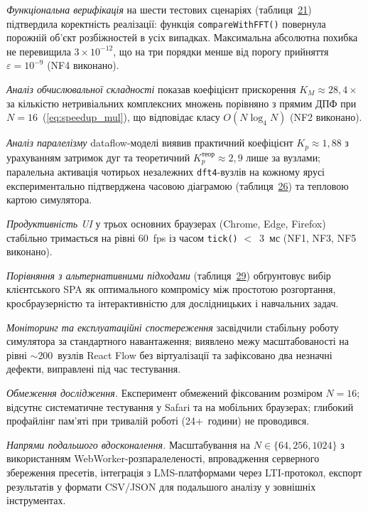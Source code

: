 \emph{Функціональна верифікація} на шести тестових сценаріях
(таблиця~\hyperref[tab:scenarios]{21}) підтвердила коректність
реалізації: функція \texttt{compareWithFFT()} повернула порожній об'єкт
розбіжностей в усіх випадках. Максимальна абсолютна похибка не
перевищила \(3 \times 10^{- 12}\), що на три порядки менше від порогу
прийняття \(\varepsilon = 10^{- 9}\) (NF4 виконано).

\emph{Аналіз обчислювальної складності} показав коефіцієнт прискорення
\(K_{M} \approx 28,4 \times\) за кількістю нетривіальних комплексних
множень порівняно з прямим ДПФ при
\(N = 16\)~(\hyperref[eq:speedup_mul]{{[}eq:speedup\_mul{]}}), що
відповідає класу \(O(N\log_{4}N)\) (NF2 виконано).

\emph{Аналіз паралелізму} dataflow-моделі виявив практичний коефіцієнт
\(K_{p} \approx 1,88\) з урахуванням затримок дуг та теоретичний
\(K_{p}^{\text{теор}} \approx 2,9\) лише за вузлами; паралельна
активація чотирьох незалежних \texttt{dft4}-вузлів на кожному ярусі
експериментально підтверджена часовою діаграмою
(таблиця~\hyperref[tab:timeline]{26}) та тепловою картою симулятора.

\emph{Продуктивність UI} у трьох основних браузерах (Chrome, Edge,
Firefox) стабільно тримається на рівні 60~fps із часом \texttt{tick()}
\(<\)~3~мс (NF1, NF3, NF5 виконано).

\emph{Порівняння з альтернативними підходами}
(таблиця~\hyperref[tab:alternatives]{29}) обґрунтовує вибір клієнтського
SPA як оптимального компромісу між простотою розгортання,
кросбраузерністю та інтерактивністю для дослідницьких і навчальних
задач.

\emph{Моніторинг та експлуатаційні спостереження} засвідчили стабільну
роботу симулятора за стандартного навантаження; виявлено межу
масштабованості на рівні \(\sim 200\)~вузлів React Flow без
віртуалізації та зафіксовано два незначні дефекти, виправлені під час
тестування.

\emph{Обмеження дослідження.} Експеримент обмежений фіксованим розміром
\(N = 16\); відсутнє систематичне тестування у Safari та на мобільних
браузерах; глибокий профайлінг пам'яті при тривалій роботі (24+~години)
не проводився.

\emph{Напрями подальшого вдосконалення.} Масштабування на
\(N \in \{ 64,256,1024\}\) з використанням WebWorker-розпаралеленості,
впровадження серверного збереження пресетів, інтеграція з
LMS-платформами через LTI-протокол, експорт результатів у формати
CSV/JSON для подальшого аналізу у зовнішніх інструментах.

